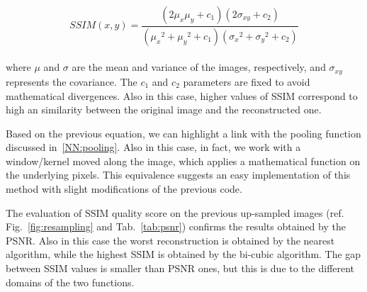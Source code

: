\documentclass{standalone}
\begin{document}
\begin{equation}
SSIM(x, y) = \frac{(2\mu_x\mu_y + c_1)(2\sigma_{xy} + c_2)}{ ({\mu_x}^2 + {\mu_y}^2 + c_1)({\sigma_x}^2 + {\sigma_y}^2 + c_2) }
\end{equation}
\\
where $\mu$ and $\sigma$ are the mean and variance of the images, respectively, and $\sigma_{xy}$ represents the covariance.
The $c_1$ and $c_2$ parameters are fixed to avoid mathematical divergences.
Also in this case, higher values of SSIM correspond to high an similarity between the original image and the reconstructed one.

Based on the previous equation, we can highlight a link with the pooling function discussed in~\ref{NN:pooling}.
Also in this case, in fact, we work with a window/kernel moved along the image, which applies a mathematical function on the underlying pixels.
This equivalence suggests an easy implementation of this method with slight modifications of the previous code.

The evaluation of SSIM quality score on the previous up-sampled images (ref. Fig.~\ref{fig:resampling} and Tab.~\ref{tab:psnr}) confirms the results obtained by the PSNR.
Also in this case the worst reconstruction is obtained by the nearest algorithm, while the highest SSIM is obtained by the bi-cubic algorithm.
The gap between SSIM values is smaller than PSNR ones, but this is due to the different domains of the two functions.
\end{document}
